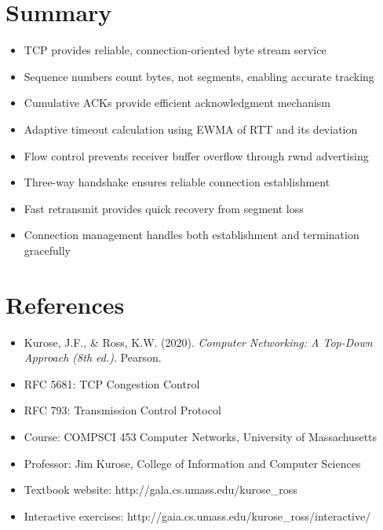 \documentclass[12pt]{article}
\begin{document}
\section{Summary}

\begin{itemize}
    \item TCP provides reliable, connection-oriented byte stream service
    \item Sequence numbers count bytes, not segments, enabling accurate tracking
    \item Cumulative ACKs provide efficient acknowledgment mechanism
    \item Adaptive timeout calculation using EWMA of RTT and its deviation
    \item Flow control prevents receiver buffer overflow through rwnd advertising
    \item Three-way handshake ensures reliable connection establishment
    \item Fast retransmit provides quick recovery from segment loss
    \item Connection management handles both establishment and termination gracefully
\end{itemize}

\section{References}
\begin{itemize}
    \item Kurose, J.F., \& Ross, K.W. (2020). \textit{Computer Networking: A Top-Down Approach (8th ed.)}. Pearson.
    \item RFC 5681: TCP Congestion Control
    \item RFC 793: Transmission Control Protocol
    \item Course: COMPSCI 453 Computer Networks, University of Massachusetts
    \item Professor: Jim Kurose, College of Information and Computer Sciences
    \item Textbook website: http://gala.cs.umass.edu/kurose\_ross
    \item Interactive exercises: http://gaia.cs.umass.edu/kurose\_ross/interactive/
\end{itemize}
\end{document}
